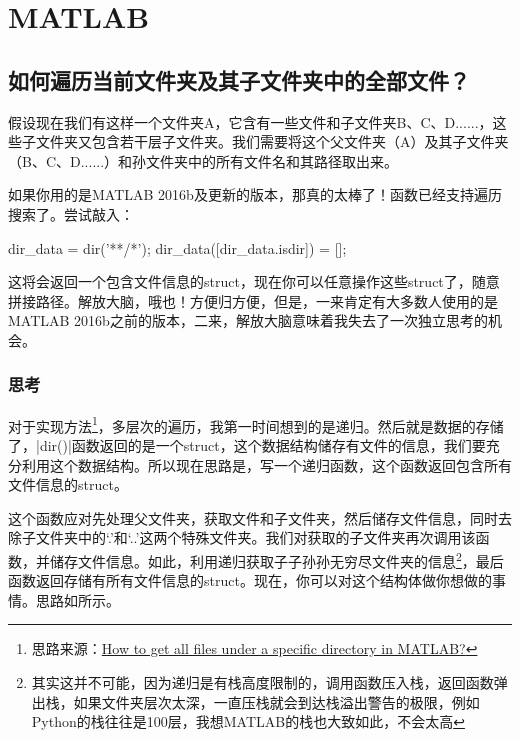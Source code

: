 \chapter{MATLAB}

\section{如何遍历当前文件夹及其子文件夹中的全部文件？}

假设现在我们有这样一个文件夹A，它含有一些文件和子文件夹B、C、D......，这些子文件夹又包含若干层子文件夹。我们需要将这个父文件夹（A）及其子文件夹（B、C、D......）和孙文件夹中的所有文件名和其路径取出来。

如果你用的是MATLAB 2016b及更新的版本，那真的太棒了！函数已经支持遍历搜索了。尝试敲入：

\begin{Matlabcode}
dir_data = dir('**/*');
dir_data([dir_data.isdir]) = [];  %
\end{Matlabcode}

这将会返回一个包含文件信息的struct，现在你可以任意操作这些struct了，随意拼接路径。解放大脑，哦也！方便归方便，但是，一来肯定有大多数人使用的是MATLAB 2016b之前的版本，二来，解放大脑意味着我失去了一次独立思考的机会。

\subsection*{思考}

对于实现方法\footnote{思路来源：\href{https://stackoverflow.com/questions/2652630/how-to-get-all-files-under-a-specific-directory-in-matlab}{How to get all files under a specific directory in MATLAB?}}，多层次的遍历，我第一时间想到的是递归。然后就是数据的存储了，\Matlabinline|dir()|函数返回的是一个struct，这个数据结构储存有文件的信息，我们要充分利用这个数据结构。所以现在思路是，写一个递归函数，这个函数返回包含所有文件信息的struct。

这个函数应对先处理父文件夹，获取文件和子文件夹，然后储存文件信息，同时去除子文件夹中的`.'和`..'这两个特殊文件夹。我们对获取的子文件夹再次调用该函数，并储存文件信息。如此，利用递归获取子子孙孙无穷尽文件夹的信息\footnote{其实这并不可能，因为递归是有栈高度限制的，调用函数压入栈，返回函数弹出栈，如果文件夹层次太深，一直压栈就会到达栈溢出警告的极限，例如Python的栈往往是100层，我想MATLAB的栈也大致如此，不会太高}，最后函数返回存储有所有文件信息的struct。现在，你可以对这个结构体做你想做的事情。思路如所示。

